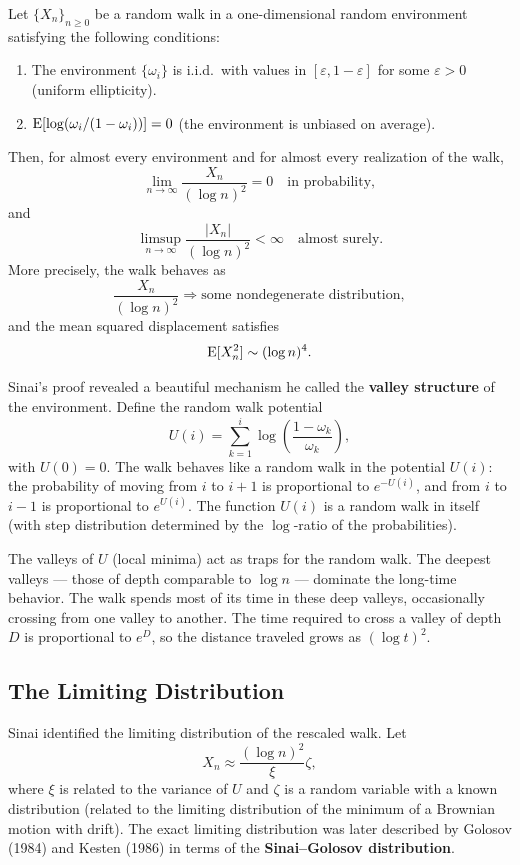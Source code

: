 \begin{theorem}
Let \(\{X_n\}_{n \ge 0}\) be a random walk in a one-dimensional random environment satisfying the following conditions:
\begin{enumerate}
  \item The environment \(\{\omega_i\}\) is i.i.d.\ with values in \([\varepsilon, 1-\varepsilon]\) for some \(\varepsilon > 0\) (uniform ellipticity).
  \item \(\operatorname{E}[\log(\omega_i/(1-\omega_i))] = 0\) (the environment is unbiased on average).
\end{enumerate}
Then, for almost every environment and for almost every realization of the walk,
\[
\lim_{n \to \infty} \frac{X_n}{(\log n)^2} = 0 \quad \text{in probability},
\]
and
\[
\limsup_{n \to \infty} \frac{|X_n|}{(\log n)^2} < \infty \quad \text{almost surely}.
\]
More precisely, the walk behaves as
\[
\frac{X_n}{(\log n)^2} \Longrightarrow \text{some nondegenerate distribution},
\]
and the mean squared displacement satisfies
\[
\operatorname{E}[X_n^2] \sim (\log n)^4.
\]\end{theorem}

Sinai's proof revealed a beautiful mechanism he called the \textbf{valley structure} of the environment. Define the random walk potential
\[
U(i) = \sum_{k=1}^i \log\left(\frac{1 - \omega_k}{\omega_k}\right),
\]
with \(U(0) = 0\). The walk behaves like a random walk in the potential \(U(i)\): the probability of moving from \(i\) to \(i+1\) is proportional to \(e^{-U(i)}\), and from \(i\) to \(i-1\) is proportional to \(e^{U(i)}\). The function \(U(i)\) is a random walk in itself (with step distribution determined by the \(\log\)-ratio of the probabilities).

The valleys of \(U\) (local minima) act as traps for the random walk. The deepest valleys --- those of depth comparable to \(\log n\) --- dominate the long-time behavior. The walk spends most of its time in these deep valleys, occasionally crossing from one valley to another. The time required to cross a valley of depth \(D\) is proportional to \(e^{D}\), so the distance traveled grows as \((\log t)^2\).

\subsection{The Limiting Distribution}

Sinai identified the limiting distribution of the rescaled walk. Let
\[
X_n \approx \frac{(\log n)^2}{\xi} \zeta,
\]
where \(\xi\) is related to the variance of \(U\) and \(\zeta\) is a random variable with a known distribution (related to the limiting distribution of the minimum of a Brownian motion with drift). The exact limiting distribution was later described by Golosov (1984) and Kesten (1986) in terms of the \textbf{Sinai--Golosov distribution}.

